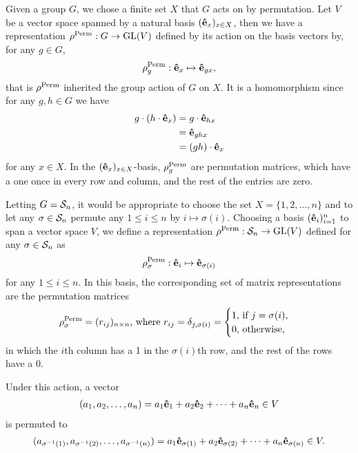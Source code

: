	Given a group $G$, we chose a finite set $X$ that $G$ acts on by permutation. Let $V$ be a vector space spanned by a natural basis $(\mathbf{\hat{e}}_x)_{x \in X}$, then we have a representation $\rho^{\text{Perm}} : G \rightarrow \text{GL}(V)$	defined by its action on the basis vectors by, for any $g \in G$, 
	\begin{align*}
		\rho_g^{\text{Perm}} : \mathbf{\hat{e}}_x \mapsto \mathbf{\hat{e}}_{gx},
	\end{align*}
	that is $\rho^{\text{Perm}}$ inherited the group action of $G$ on $X$. It is a homomorphism since for any $g,h \in G$ we have
	{\allowdisplaybreaks\begin{align*}
		g \cdot (h \cdot \mathbf{\hat{e}}_x) &= g \cdot \mathbf{\hat{e}}_{hx} \\
		&= \mathbf{\hat{e}}_{ghx} \\
		&= (gh) \cdot \mathbf{\hat{e}}_x
	\end{align*}}
	for any $x \in X$. %
	In the $(\mathbf{\hat{e}}_x)_{x \in X}$-basis, $\rho_g^{\text{Perm}}$ are permutation matrices, which have a one once in every row and column, and the rest of the entries are zero.
	
	Letting $G = \mathcal{S}_n$, it would be appropriate to choose the set $X = \{1, 2, \dots, n\}$ and to let any $\sigma \in \mathcal{S}_n$ permute any $1 \leq i \leq n$ by $i \mapsto \sigma(i)$. Choosing a basis $(\mathbf{\hat{e}}_i)_{i=1}^n$ to span a vector space $V$, we define a representation $\rho^{\text{Perm}}: \mathcal{S}_n \rightarrow \text{GL}(V)$ defined for any $\sigma \in \mathcal{S}_n$ as
	\begin{align*}
		\rho_\sigma^{\text{Perm}}: \mathbf{\hat{e}}_i \mapsto \mathbf{\hat{e}}_{\sigma(i)}
	\end{align*}
	for any $1 \leq i \leq n$. In this basis, the corresponding set of matrix representations are the permutation matrices
	\begin{align*}
		\rho_\sigma^{\text{Perm}} = (r_{ij})_{n \times n} \text{, where } r_{ij} = \delta_{j,\sigma(i)} = \begin{cases}
			1 \text{, if $j = \sigma(i)$,} \\
			0 \text{, otherwise,}
		\end{cases}
	\end{align*}
	in which the $i$th column has a 1 in the $\sigma(i)$th row, and the rest of the rows have a 0.
	
	Under this action, a vector
	\begin{align*}
		(a_1, a_2, \dots, a_n) = a_1 \mathbf{\hat{e}}_1 + a_2 \mathbf{\hat{e}}_2 + \dots + a_n \mathbf{\hat{e}}_n \in V
	\end{align*}
	is permuted to 
	\begin{align*}
		(a_{\sigma^{-1}(1)}, a_{\sigma^{-1}(2)}, \dots, a_{\sigma^{-1}(n)}) = a_1 \mathbf{\hat{e}}_{\sigma(1)} + a_2 \mathbf{\hat{e}}_{\sigma(2)} + \dots + a_n \mathbf{\hat{e}}_{\sigma(n)}  \in V.
	\end{align*}
	
